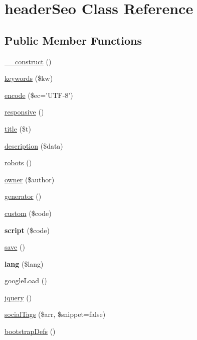 \hypertarget{classheader_seo}{\section{header\-Seo Class Reference}
\label{classheader_seo}
}
\subsection*{Public Member Functions}
\begin{DoxyCompactItemize}
\item 
\hyperlink{classheader_seo_a095c5d389db211932136b53f25f39685}{\-\_\-\-\_\-construct} ()
\item 
\hyperlink{classheader_seo_a6731160af6291e4d9f49bdf99e12eea8}{keywords} (\$kw)
\item 
\hyperlink{classheader_seo_adf0fd8dd948e7622a113218888789b4c}{encode} (\$ec='U\-T\-F-\/8')
\item 
\hyperlink{classheader_seo_abfdce57af88e3f1213816e5e6a6676e9}{responsive} ()
\item 
\hyperlink{classheader_seo_a8a181ec2d8a26ba25144cad400ca3a87}{title} (\$t)
\item 
\hyperlink{classheader_seo_a9ac92a195c29bc1edc1475eef4923c72}{description} (\$data)
\item 
\hyperlink{classheader_seo_a63237197ed5c8199150856dc71ec9e97}{robots} ()
\item 
\hyperlink{classheader_seo_a2dcb21be96d78f504583452f906e8ad1}{owner} (\$author)
\item 
\hyperlink{classheader_seo_a3d46f2f84b0bf0de1921a0cb899bedff}{generator} ()
\item 
\hyperlink{classheader_seo_a61e85615da2625b55b5580d7ec5e9258}{custom} (\$code)
\item 
\hypertarget{classheader_seo_a21fdbf37b0f5c645d980ba7a96fabf6e}{{\bfseries script} (\$code)}\label{classheader_seo_a21fdbf37b0f5c645d980ba7a96fabf6e}

\item 
\hyperlink{classheader_seo_afc8a3c62679cf00ade9f15fb2a6d6132}{save} ()
\item 
\hypertarget{classheader_seo_aa47df0e5b5191e604c711ede952a91fd}{{\bfseries lang} (\$lang)}\label{classheader_seo_aa47df0e5b5191e604c711ede952a91fd}

\item 
\hyperlink{classheader_seo_a7d18829341f798ff00342e4e7d96030a}{google\-Load} ()
\item 
\hyperlink{classheader_seo_a1b6489fdb8d3547f32072eb5a3abd514}{jquery} ()
\item 
\hyperlink{classheader_seo_ac49e736b6e84fc47561fcf0dfe4df35b}{social\-Tags} (\$arr, \$snippet=false)
\item 
\hyperlink{classheader_seo_a861ffee5950974206ca24646eab7d39f}{bootstrap\-Defs} ()
\end{DoxyCompactItemize}
